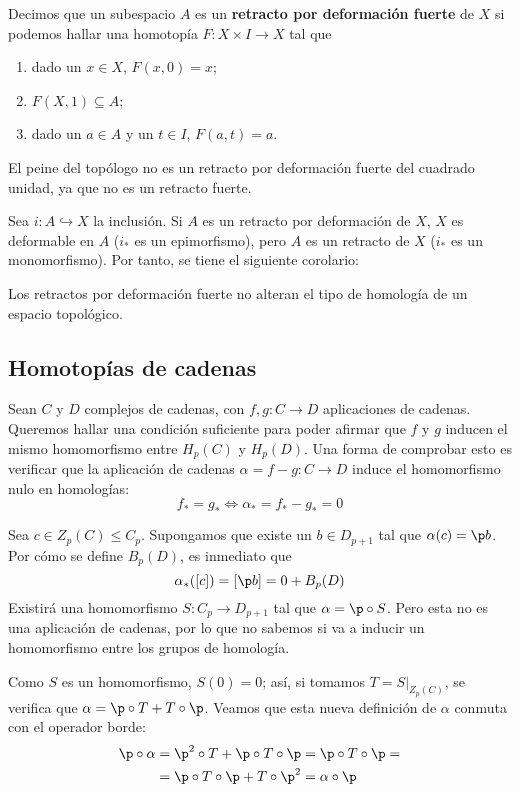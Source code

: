 \begin{defn}
Decimos que un subespacio $A$ es un \textbf{retracto por deformación fuerte} de
$X$ si podemos hallar una homotopía $F\colon X\times I \to X$ tal que 
\begin{enumerate}
\item dado un $x \in X$, $F(x,0)=x$;
\item $F(X,1) \subseteq A$;
\item dado un $a \in A$ y un $t \in I$, $F(a,t)=a$.
\end{enumerate}
\end{defn}

\begin{example}
El peine del topólogo no es un retracto por deformación fuerte del cuadrado
unidad, ya que no es un retracto fuerte.
\end{example}

Sea $i\colon A \hookrightarrow X$ la inclusión. Si $A$ es un retracto por
deformación de $X$, $X$ es deformable en $A$ ($i_*$ es un epimorfismo), pero $A$
es un retracto de $X$ ($i_*$ es un monomorfismo). Por tanto, se tiene el
siguiente corolario:

\begin{corollary}
Los retractos por deformación fuerte no alteran el tipo de homología de un
espacio topológico.
\end{corollary}

\subsection{Homotopías de cadenas}
Sean $C$ y $D$ complejos de cadenas, con $f,g\colon C \to D$ aplicaciones de
cadenas. Queremos hallar una condición suficiente para poder afirmar que $f$ y $g$
inducen el mismo homomorfismo entre $H_p(C)$ y $H_p(D)$. Una forma de comprobar
esto es verificar que la aplicación de cadenas $\alpha=f-g\colon C \to D$ induce
el homomorfismo nulo en homologías:
\[f_*=g_* \iff \alpha_*=f_*-g_*=0\]

Sea $c \in Z_p(C) \leq C_p$. Supongamos que existe un $b \in D_{p+1}$ tal que
$\alpha(c)=\p b$. Por cómo se define $B_p(D)$, es inmediato que
\[\alpha_*([c])=[\p b]=0+B_p(D)\]
Existirá una homomorfismo $S\colon C_p \to D_{p+1}$ tal que $\alpha=\p \circ S$.
Pero esta no es una aplicación de cadenas, por lo que no sabemos si va a inducir
un homomorfismo entre los grupos de homología.

Como $S$ es un homomorfismo, $S(0)=0$; así, si tomamos $T=S|_{Z_p(C)}$, se
verifica que $\alpha=\p \circ T + T \circ \p$. Veamos que esta nueva definición
de $\alpha$ conmuta con el operador borde:
\begin{align*}
\p \circ \alpha &=
\p^2 \circ T+\p \circ T \circ \p =
\p \circ T \circ \p=\\
&=\p \circ T \circ \p + T \circ \p^2 =
\alpha \circ \p
\end{align*}

